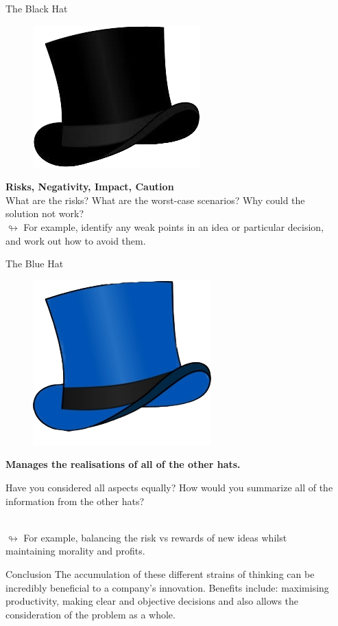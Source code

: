 \documentclass[final]{beamer}
\newlength{\sepwidth}
\newlength{\colwidth}
\newcommand{\separatorcolumn}{\begin{column}{\sepwidth}\end{column}}
\begin{document}
\begin{frame}{}
\begin{columns}[t]
\begin{column}{\colwidth}
    \begin{myblock}{The Black Hat} 
    \begin{figure}
        \includegraphics[height=0.4\textwidth]{Images/black_tr.png}
    \end{figure}
    \textbf{Risks, Negativity, Impact, Caution}
    \\ What are the risks?
    What are the worst-case scenarios?
    Why could the solution not work?
    \\ $\looparrowright$ For example, identify any weak points in an idea or particular decision, and work out how to avoid them.
    \end{myblock}

    
    \begin{myblock}{The Blue Hat} 
    \begin{figure}
        \includegraphics[height=0.42\textwidth]{Images/tr2.png}
    \end{figure}
    \textbf{Manages the realisations of all of the other hats.}

    Have you considered all aspects equally?
    How would you summarize all of the information from the other hats?

    \\ $\looparrowright$ For example, balancing the risk vs rewards of new ideas whilst maintaining morality and profits.
    \end{myblock}

    \begin{myblock}{Conclusion} 
    The accumulation of these different strains of thinking can be incredibly beneficial to a company’s innovation. Benefits include: maximising productivity, making clear and objective decisions and also allows the consideration of the problem as a whole.
    \end{myblock}
    
\end{column}

\separatorcolumn
\end{columns}
\end{frame}
\end{document}
